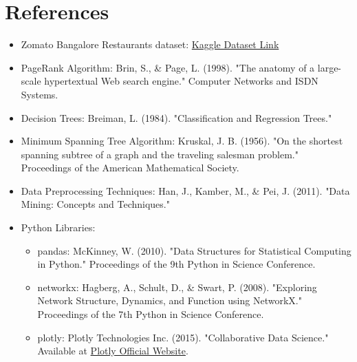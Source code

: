 \documentclass[fontsize=11pt]{article}
\begin{document}
\section*{References}
\begin{itemize}
    \item Zomato Bangalore Restaurants dataset: \href{https://www.kaggle.com/datasets/himanshupoddar/zomato-bangalore-restaurants}{Kaggle Dataset Link}
    \item PageRank Algorithm: Brin, S., \& Page, L. (1998). "The anatomy of a large-scale hypertextual Web search engine." Computer Networks and ISDN Systems.
    \item Decision Trees: Breiman, L. (1984). "Classification and Regression Trees."
    \item Minimum Spanning Tree Algorithm: Kruskal, J. B. (1956). "On the shortest spanning subtree of a graph and the traveling salesman problem." Proceedings of the American Mathematical Society.
    \item Data Preprocessing Techniques: Han, J., Kamber, M., \& Pei, J. (2011). "Data Mining: Concepts and Techniques."
    \item Python Libraries:
    \begin{itemize}
        \item pandas: McKinney, W. (2010). "Data Structures for Statistical Computing in Python." Proceedings of the 9th Python in Science Conference.
        \item networkx: Hagberg, A., Schult, D., \& Swart, P. (2008). "Exploring Network Structure, Dynamics, and Function using NetworkX." Proceedings of the 7th Python in Science Conference.
        \item plotly: Plotly Technologies Inc. (2015). "Collaborative Data Science." Available at \href{https://plotly.com}{Plotly Official Website}.
    \end{itemize}
\end{itemize}
\end{document}
